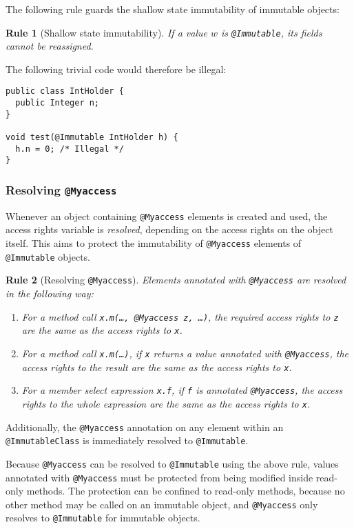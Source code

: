 \documentclass{pracamgr}
\theoremstyle{break}
\theoremstyle{break}
\theoremstyle{break}
\newtheorem{verrule}{Rule}
\begin{document}
The following rule guards the shallow state immutability of immutable
objects:

\begin{verrule}[Shallow state immutability]
  If a value $w$ is \texttt{@Immutable}, its fields cannot be
  reassigned.
\end{verrule}
The following trivial code would therefore be illegal:
\begin{lstlisting}
public class IntHolder {
  public Integer n;
}

void test(@Immutable IntHolder h) {
  h.n = 0; /* Illegal */
}
\end{lstlisting}

\subsubsection{Resolving \texttt{@Myaccess}}  

Whenever an object containing \texttt{@Myaccess} elements is created
and used, the access rights variable is \emph{resolved}, depending on
the access rights on the object itself. This aims to protect the
immutability of \texttt{@Myaccess} elements of \texttt{@Immutable}
objects.

\begin{verrule}[Resolving \texttt{@Myaccess}]
  Elements annotated with \texttt{@Myaccess} are resolved in the
  following way:
  \begin{enumerate}[label=(\arabic*)]
  \item For a method call \texttt{x.m(\dots, @Myaccess z, \dots)}, the
    required access rights to \texttt{z} are the same as the access
    rights to \texttt{x}.
  \item For a method call \texttt{x.m(\dots)}, if \texttt{x} returns a
    value annotated with \texttt{@Myaccess}, the access rights to the
    result are the same as the access rights to \texttt{x}.
  \item For a member select expression \texttt{x.f}, if \texttt{f} is
    annotated \texttt{@Myaccess}, the access rights to the whole
    expression are the same as the access rights to \texttt{x}.
  \end{enumerate}
\end{verrule}
Additionally, the \texttt{@Myaccess} annotation on any element within
an \texttt{@ImmutableClass} is immediately resolved to
\texttt{@Immutable}.

Because \texttt{@Myaccess} can be resolved to \texttt{@Immutable}
using the above rule, values annotated with \texttt{@Myaccess} must be
protected from being modified inside read-only methods. The protection
can be confined to read-only methods, because no other method may be
called on an immutable object, and \texttt{@Myaccess} only resolves to
\texttt{@Immutable} for immutable objects.
\end{document}
